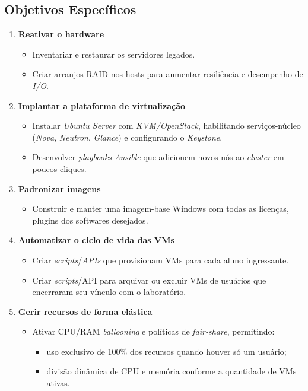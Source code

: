 \subsection{Objetivos Específicos}
\begin{enumerate}
    \item \textbf{Reativar o hardware}
    \begin{itemize}
        \item Inventariar e restaurar os servidores legados.
        \item Criar arranjos RAID nos hosts para aumentar resiliência e desempenho de \textit{I/O}.
    \end{itemize}
    
    \item \textbf{Implantar a plataforma de virtualização}
    \begin{itemize}
        \item Instalar \textit{Ubuntu Server} com \textit{KVM/OpenStack}, habilitando serviços-núcleo (\textit{Nova}, \textit{Neutron}, \textit{Glance}) e configurando o \textit{Keystone}.
        \item Desenvolver \textit{playbooks} \textit{Ansible} que adicionem novos nós ao \textit{cluster} em poucos cliques.
    \end{itemize}
    
    \item \textbf{Padronizar imagens}
    \begin{itemize}
        \item Construir e manter uma imagem-base Windows com todas as licenças, plugins dos softwares desejados.
    \end{itemize}
    
    \item \textbf{Automatizar o ciclo de vida das VMs}
    \begin{itemize}
        \item Criar \textit{scripts}/\textit{APIs} que provisionam VMs para cada aluno ingressante.
        \item Criar \textit{scripts}/API para arquivar ou excluir VMs de usuários que encerraram seu vínculo com o laboratório.
    \end{itemize}
    
    \item \textbf{Gerir recursos de forma elástica}
    \begin{itemize}
        \item Ativar CPU/RAM \textit{ballooning} e políticas de \textit{fair-share}, permitindo:
        \begin{itemize}
            \item uso exclusivo de 100\% dos recursos quando houver só um usuário;
            \item divisão dinâmica de CPU e memória conforme a quantidade de VMs ativas.
        \end{itemize}
    \end{itemize}
    

\end{enumerate}

